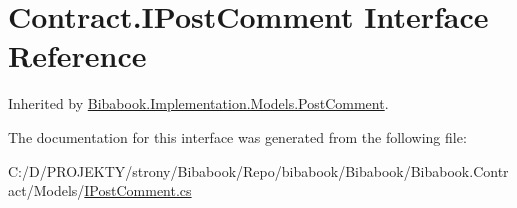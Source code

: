 \hypertarget{interface_contract_1_1_i_post_comment}{}\section{Contract.\+I\+Post\+Comment Interface Reference}
\label{interface_contract_1_1_i_post_comment}


Inherited by \hyperlink{class_bibabook_1_1_implementation_1_1_models_1_1_post_comment}{Bibabook.\+Implementation.\+Models.\+Post\+Comment}.



The documentation for this interface was generated from the following file\+:\begin{DoxyCompactItemize}
\item 
C\+:/\+D/\+P\+R\+O\+J\+E\+K\+T\+Y/strony/\+Bibabook/\+Repo/bibabook/\+Bibabook/\+Bibabook.\+Contract/\+Models/\hyperlink{_i_post_comment_8cs}{I\+Post\+Comment.\+cs}\end{DoxyCompactItemize}
